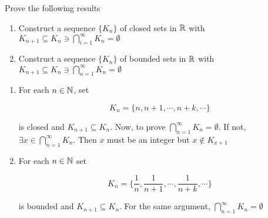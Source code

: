 Prove the following results

\begin{enumerate}
	\item Construct a sequence $\{K_n\}$ of closed sets in $\mathbb{R}$ with $K_{n+1} \subseteq K_n \ni \bigcap^{\infty}_{i = 1}K_n = \emptyset$
	\item Construct a sequence $\{K_n\}$ of bounded sets in $\mathbb{R}$ with $K_{n + 1} \subseteq K_n \ni \bigcap^{\infty}_{n = 1}K_n = \emptyset$
\end{enumerate}

\begin{tcolorbox}
	\begin{solution}
		\begin{enumerate}
			\item For each $n \in \mathbb{N}$, set
			
			$$K_n = \{n,n+1,\cdots,n+k,\cdots\}$$
			
			is closed and $K_{n + 1} \subseteq K_n$. Now, to prove $\bigcap^{\infty}_{n = 1}K_n = \emptyset$. If not, $\exists x \in \bigcap^{\infty}_{n = 1}K_n$. Then $x$ must be an integer but $x \notin K_{x + 1}$
			\item For each $n \in \mathbb{N}$ set
			
			$$K_n = \{\dfrac{1}{n},\dfrac{1}{n+1},\cdots,\dfrac{1}{n+k},\cdots\}$$
			
			is bounded and $K_{n+1} \subseteq K_{n}$. For the same argument, $\bigcap^{\infty}_{n = 1}K_n = \emptyset$
		\end{enumerate}
	\end{solution}
\end{tcolorbox}